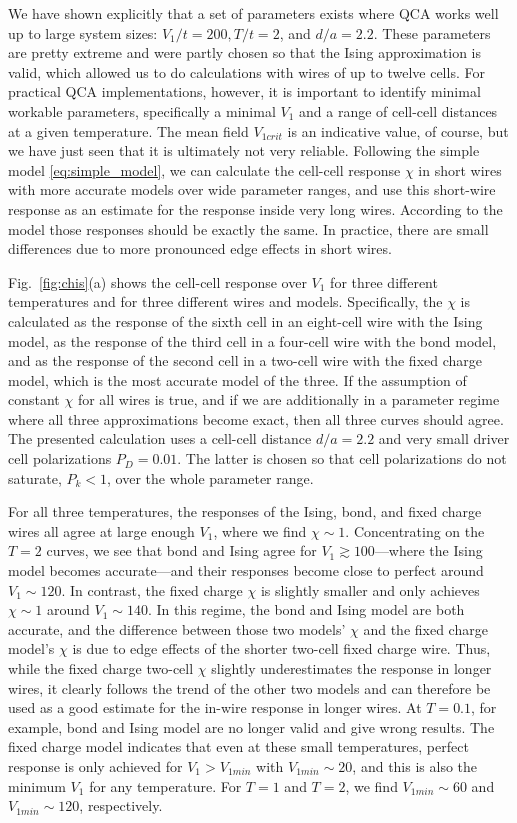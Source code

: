 We have shown explicitly that a set of parameters exists where QCA works well up
to large system sizes: $V_1/t = 200, T/t = 2$, and $d/a = 2.2$. These parameters
are pretty extreme and were partly chosen so that the Ising approximation is
valid, which allowed us to do calculations with wires of up to twelve cells. For
practical QCA implementations, however, it is important to identify minimal
workable parameters, specifically a minimal $V_1$ and a range of cell-cell
distances at a given temperature. The mean field $V_{1crit}$ is an indicative
value, of course, but we have just seen that it is ultimately not very reliable.
Following the simple model \eqref{eq:simple_model}, we can calculate the
cell-cell response $\chi$ in short wires with more accurate models over wide
parameter ranges, and use this short-wire response as an estimate for the
response inside very long wires. According to the model those responses should
be exactly the same. In practice, there are small differences due to more
pronounced edge effects in short wires.

Fig.~\ref{fig:chis}(a) shows the cell-cell response over $V_1$ for three
different temperatures and for three different wires and models. Specifically,
the $\chi$ is calculated as the response of the sixth cell in an eight-cell wire
with the Ising model, as the response of the third cell in a four-cell wire with
the bond model, and as the response of the second cell in a two-cell wire with
the fixed charge model, which is the most accurate model of the three. If the
assumption of constant $\chi$ for all wires is true, and if we are additionally
in a parameter regime where all three approximations become exact, then all
three curves should agree. The presented calculation uses a cell-cell distance
$d/a = 2.2$ and very small driver cell polarizations $P_D = 0.01$. The latter is
chosen so that cell polarizations do not saturate, $P_k < 1$, over the whole
parameter range.

For all three temperatures, the responses of the Ising, bond, and fixed charge
wires all agree at large enough $V_1$, where we find $\chi \sim 1$.
Concentrating on the $T = 2$ curves, we see that bond and Ising agree for $V_1
\gtrsim 100$---where the Ising model becomes accurate---and their responses
become close to perfect around $V_1 \sim 120$. In contrast, the fixed charge
$\chi$ is slightly smaller and only achieves $\chi \sim 1$ around $V_1 \sim
140$. In this regime, the bond and Ising model are both accurate, and the
difference between those two models' $\chi$ and the fixed charge model's $\chi$
is due to edge effects of the shorter two-cell fixed charge wire. Thus, while
the fixed charge two-cell $\chi$ slightly underestimates the response in longer
wires, it clearly follows the trend of the other two models and can therefore be
used as a good estimate for the in-wire response in longer wires. At $T = 0.1$,
for example, bond and Ising model are no longer valid and give wrong results.
The fixed charge model indicates that even at these small temperatures, perfect
response is only achieved for $V_1 > V_{1min}$ with $V_{1min} \sim 20$, and this
is also the minimum $V_1$ for any temperature. For $T = 1$ and $T = 2$, we find
$V_{1min} \sim 60$ and $V_{1min} \sim 120$, respectively.

